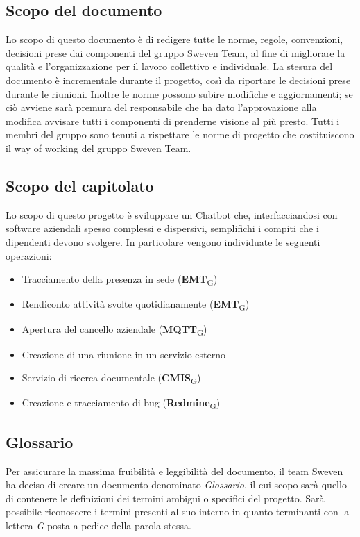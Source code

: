 \subsection{Scopo del documento}
Lo scopo di questo documento è di redigere tutte le norme, regole, convenzioni, decisioni 
prese dai componenti del gruppo Sweven Team, al fine di migliorare la qualità e l'organizzazione
per il lavoro collettivo e individuale. \newline
La stesura del documento è incrementale durante il progetto, così da riportare le decisioni
prese durante le riunioni. Inoltre le norme possono subire modifiche e aggiornamenti;
se ciò avviene sarà premura del responsabile che ha dato l'approvazione alla modifica 
avvisare tutti i componenti di prenderne visione al più presto. \newline 
Tutti i membri del gruppo sono tenuti a rispettare le norme di progetto che costituiscono
il way of working del gruppo Sweven Team.

\subsection{Scopo del capitolato}
Lo scopo di questo progetto è sviluppare un Chatbot che, interfacciandosi con software aziendali spesso 
complessi e dispersivi, semplifichi i compiti che i dipendenti devono svolgere. In particolare vengono 
individuate le seguenti operazioni: 
\begin{itemize}
	\item Tracciamento della presenza in sede (\textbf{EMT}\textsubscript{G})
	\item Rendiconto attività svolte quotidianamente (\textbf{EMT}\textsubscript{G})
	\item Apertura del cancello aziendale (\textbf{MQTT}\textsubscript{G})
	\item Creazione di una riunione in un servizio esterno
	\item Servizio di ricerca documentale (\textbf{CMIS}\textsubscript{G})
	\item Creazione e tracciamento di bug (\textbf{Redmine}\textsubscript{G})
\end{itemize}

\subsection{Glossario}
Per assicurare la massima fruibilità e leggibilità del documento, il team Sweven ha deciso di creare un 
documento denominato \textit{Glossario}, il cui scopo sarà quello di contenere le definizioni dei termini 
ambigui o specifici del progetto. Sarà possibile riconoscere i termini presenti al suo interno in quanto 
terminanti con la lettera \textit{G} posta a pedice della parola stessa. 
